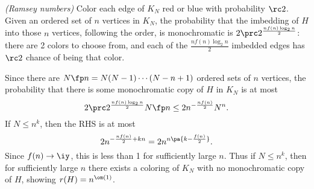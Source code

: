 \begin{problem} {\it (Ramsey numbers)}
Color each edge of $K_N$ red or blue with probability $\rc 2$. 
Given an ordered set of $n$ vertices in $K_N$, the probability that the imbedding of $H$ into those $n$ vertices, following the order, is monochromatic is $2\prc 2^{\frac{nf(n)\log_2 n}{2}}$: there are 2 colors to choose from, and each of the $\frac{nf(n)\log_2 n}{2}$ imbedded edges has $\rc 2$ chance of being that color.

Since there are $N\fp n=N(N-1)\cdots (N-n+1)$ ordered sets of $n$ vertices, the probability that there is some monochromatic copy of $H$ in $K_N$ is at most
\[
2\prc 2^{\frac{nf(n)\log_2 n}{2}}N\fp n
\le 2n^{-\frac{nf(n)}{2}} N^n.
\]
If $N\le n^k$, then the RHS is at most
\[
2n^{-\frac{nf(n)}{2}+kn}=2n^{n\pa{k-\frac{f(n)}2}}.
\]
Since $f(n)\to \iy$, this is less than 1 for sufficiently large $n$. Thus if $N\le n^k$, then for sufficiently large $n$ there exists a coloring of $K_N$ with no monochromatic copy of $H$, showing $r(H)=n^{\om(1)}$.
\end{problem}

